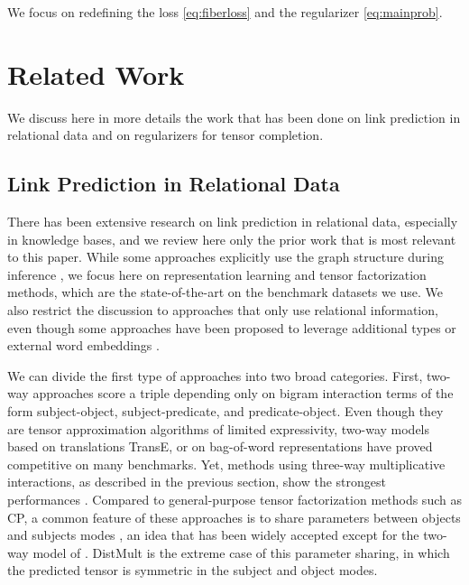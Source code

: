 \documentclass{article}
\newcommand{\CP}{{CP}\xspace}
\newcommand{\distmult}{{DistMult}\xspace}
\newcommand{\transe}{{TransE}\xspace}
\begin{document}
We focus on redefining the loss \eqref{eq:fiberloss} and the regularizer \eqref{eq:mainprob}.

\section{Related Work}
\label{sec:rel_work}
We discuss here in more details the work that has been done on link prediction in relational data and on regularizers for tensor completion.

\subsection{Link Prediction in Relational Data}
There has been extensive research on link prediction in relational data, especially in knowledge bases, and we review here only the prior work that is most relevant to this paper. While some approaches explicitly use the graph structure during inference \citep{lao_random_2011}, we focus here on representation learning and tensor factorization methods, which are the state-of-the-art on the benchmark datasets we use. We also restrict the discussion to approaches that only use relational information, even though some approaches have been proposed to leverage additional types \citep{krompas_s_type-constrained_2015,ma2017transt} or external word embeddings \citep{toutanova_observed_2015}.

We can divide the first type of approaches into two broad categories. First, two-way approaches score a triple  depending only on bigram interaction terms of the form subject-object, subject-predicate, and predicate-object. Even though they are tensor approximation algorithms of limited expressivity, two-way models based on translations \transe, or on bag-of-word representations \citep{joulin2017fast} have proved competitive on many benchmarks. Yet, methods using three-way multiplicative interactions, as described in the previous section, show the strongest performances \citep{bordes_learning_2011,garcia-duran_combining_2015,nickel_holographic_2015,trouillon_complex_2016}. Compared to general-purpose tensor factorization methods such as \CP, a common feature of these approaches is to share parameters between objects and subjects modes \citep{nickel_three-way_2011}, an idea that has been widely accepted except for the two-way model of \citet{joulin2017fast}. \distmult \citep{yang_embedding_2014} is the extreme case of this parameter sharing, in which the predicted tensor is symmetric in the subject and object modes. 
\end{document}

